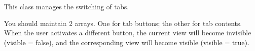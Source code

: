 This class manages the switching of tabs.

You should maintain 2 arrays. One for tab buttons; the other for tab contents.
When the user activates a different button, the current view will become invisible (visible = false),
and the corresponding view will become visible (visible = true).

